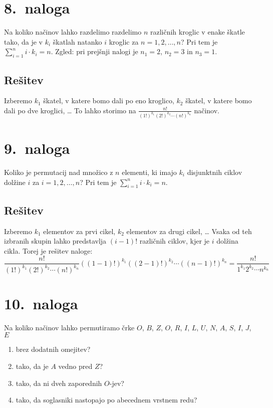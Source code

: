 \documentclass[11pt]{article}
\begin{document}
\section*{8.~naloga}
Na koliko načinov lahko razdelimo razdelimo \(n\) različnih kroglic v enake škatle tako, da
je v \(k_i\) škatlah natanko \(i\) kroglic za \(n = 1, 2, \ldots, n\)? Pri tem je \(\sum_{i=1}^{n}i \cdot k_i = n\).
Zgled: pri prejšnji nalogi je \(n_1 = 2\), \(n_2 = 3\) in \(n_3 = 1\).

\subsection*{Rešitev}
Izberemo \(k_1\) škatel, v katere bomo dali po eno kroglico, \(k_2\) škatel, v katere bomo dali po dve kroglici, \dots
To lahko storimo na \(\frac{n!}{{\left(1!\right)}^{k_1} {\left(2!\right)}^{k_2} \cdots {\left(n!\right)}^{k_n}}\) načinov.

\section*{9.~naloga}
Koliko je permutacij nad množico z \(n\) elementi, ki imajo \(k_i\) disjunktnih ciklov dolžine \(i\)
za \(i = 1, 2, \ldots, n\)? Pri tem je \(\sum_{i=1}^{n}i \cdot k_i = n\).

\subsection*{Rešitev}
Izberemo \(k_1\) elementov za prvi cikel, \(k_2\) elementov za drugi cikel, \dots
Vsaka od teh izbranih skupin lahko predstavlja \(\left(i - 1\right)!\) različnih ciklov, kjer je \(i\) dolžina cikla. 
Torej je rešitev naloge:
\[\frac{n!}{{\left(1!\right)}^{k_1} {\left(2!\right)}^{k_2} \cdots {\left(n!\right)}^{k_n}} 
{\left(\left(1 - 1\right)!\right)}^{k_1} {\left(\left(2 - 1\right)!\right)}^{k_2} \cdots {\left(\left(n - 1\right)!\right)}^{k_n}
= \frac{n!}{1^{k_1} 2^{k_2} \cdots n^{k_n}}\]


\section*{10.~naloga}
Na koliko načinov lahko permutiramo črke \(O\), \(B\), \(Z\), \(O\), \(R\), \(I\), \(L\), \(U\), \(N\), \(A\), \(S\), \(I\), \(J\), \(E\)
\begin{enumerate}[label=(\alph*)]
    \item brez dodatnih omejitev?
    \item tako, da je \(A\) vedno pred \(Z\)?
    \item tako, da ni dveh zaporednih \(O\)-jev?
    \item tako, da soglasniki nastopajo po abecednem vrstnem redu?
\end{enumerate}
\end{document}
